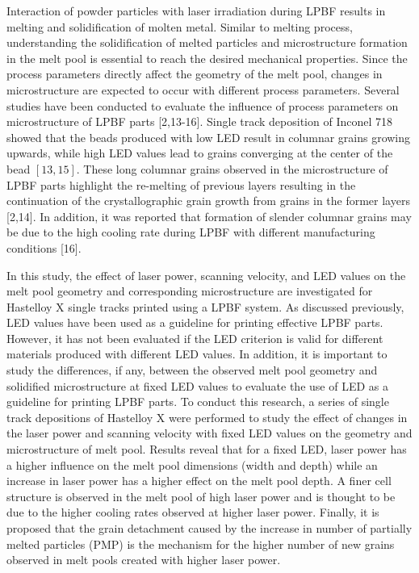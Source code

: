 \documentclass[10pt]{article}
\begin{document}
Interaction of powder particles with laser irradiation during LPBF results in melting and solidification of molten metal. Similar to melting process, understanding the solidification of melted particles and microstructure formation in the melt pool is essential to reach the desired mechanical properties. Since the process parameters directly affect the geometry of the melt pool, changes in microstructure are expected to occur with different process parameters. Several studies have been conducted to evaluate the influence of process parameters on microstructure of LPBF parts [2,13-16]. Single track deposition of Inconel 718 showed that the beads produced with low LED result in columnar grains growing upwards, while high LED values lead to grains converging at the center of the bead $[13,15]$. These long columnar grains observed in the microstructure of LPBF parts highlight the re-melting of previous layers resulting in the continuation of the crystallographic grain growth from grains in the former layers [2,14]. In addition, it was reported that formation of slender columnar grains may be due to the high cooling rate during LPBF with different manufacturing conditions [16].

In this study, the effect of laser power, scanning velocity, and LED values on the melt pool geometry and corresponding microstructure are investigated for Hastelloy X single tracks printed using a LPBF system. As discussed previously, LED values have been used as a guideline for printing effective LPBF parts. However, it has not been evaluated if the LED criterion is valid for different materials produced with different LED values. In addition, it is important to study the differences, if any, between the observed melt pool geometry and solidified microstructure at fixed LED values to evaluate the use of LED as a guideline for printing LPBF parts. To conduct this research, a series of single track depositions of Hastelloy X were performed to study the effect of changes in the laser power and scanning velocity with fixed LED values on the geometry and microstructure of melt pool. Results reveal that for a fixed LED, laser power has a higher influence on the melt pool dimensions (width and depth) while an increase in laser power has a higher effect on the melt pool depth. A finer cell structure is observed in the melt pool of high laser power and is thought to be due to the higher cooling rates observed at higher laser power. Finally, it is proposed that the grain detachment caused by the increase in number of partially melted particles (PMP) is the mechanism for the higher number of new grains observed in melt pools created with higher laser power.
\end{document}
